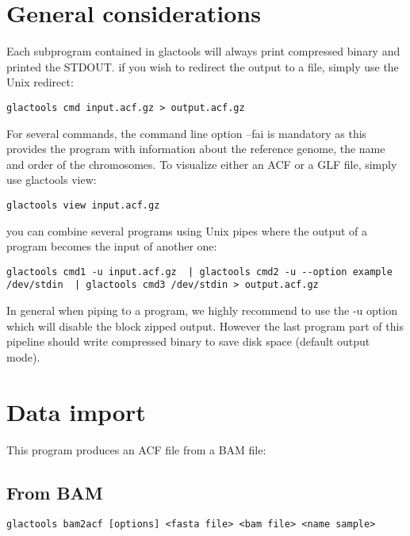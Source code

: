 \documentclass[a4paper]{article}
\begin{document}
\section{General considerations}

Each subprogram contained in glactools will always print compressed binary and printed the STDOUT.  if you wish to redirect the output to a file, simply use the Unix redirect:

\begin{lstlisting}
glactools cmd input.acf.gz > output.acf.gz 
\end{lstlisting}

\noindent  For several commands, the command line option --fai is mandatory as this provides the program with information about the reference genome, the name  and order of the chromosomes. To visualize either an ACF or a GLF file,  simply use glactools view:


\begin{lstlisting}
glactools view input.acf.gz 
\end{lstlisting}

\noindent you can combine several programs using Unix pipes where the output of a program becomes the input of another one:

\begin{lstlisting}
glactools cmd1 -u input.acf.gz  | glactools cmd2 -u --option example /dev/stdin  | glactools cmd3 /dev/stdin > output.acf.gz
\end{lstlisting}

\noindent In general when piping to a program, we highly recommend to use the -u option which will disable the block zipped output.  However the last program part of this pipeline should write compressed binary to save disk space (default output mode). 


\section{Data import}

\noindent This program produces an ACF file from a BAM file:

\subsection{From BAM}

\small
\begin{lstlisting} 
glactools bam2acf [options] <fasta file> <bam file> <name sample> 
\end{lstlisting} 
\normalsize
\end{document}
